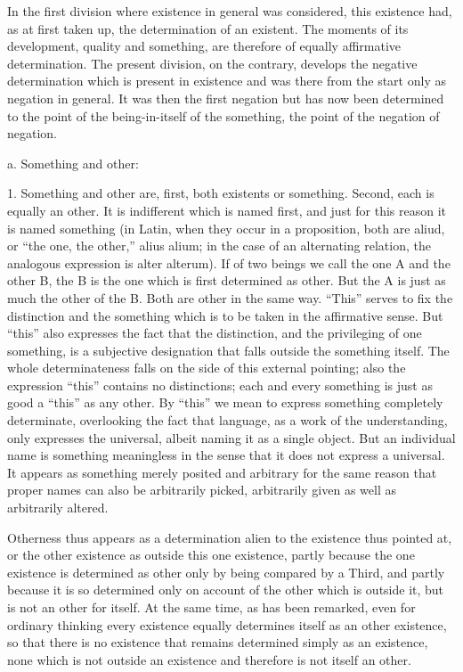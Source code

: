 In the first division where existence in general was considered,
this existence had, as at first taken up, the determination of an existent.
The moments of its development, quality and something,
are therefore of equally affirmative determination.
The present division, on the contrary, develops
the negative determination which is present in existence
and was there from the start only as negation in general.
It was then the first negation but has now been determined to
the point of the being-in-itself of the something,
the point of the negation of negation.

a. Something and other:

1. Something and other are,
first, both existents or something.
Second, each is equally an other.
It is indifferent which is named first,
and just for this reason it is named something
(in Latin, when they occur in a proposition,
both are aliud, or “the one, the other,” alius alium;
in the case of an alternating relation,
the analogous expression is alter alterum).
If of two beings we call the one A and the other B,
the B is the one which is first determined as other.
But the A is just as much the other of the B.
Both are other in the same way.
“This” serves to fix the distinction
and the something which is to be taken in the affirmative sense.
But “this” also expresses the fact that the distinction,
and the privileging of one something,
is a subjective designation that falls outside the something itself.
The whole determinateness falls on the side of this external pointing;
also the expression “this” contains no distinctions;
each and every something is just as good a “this” as any other.
By “this” we mean to express something completely determinate,
overlooking the fact that language, as a work of the understanding,
only expresses the universal, albeit naming it as a single object.
But an individual name is something meaningless in the sense
that it does not express a universal.
It appears as something merely posited
and arbitrary for the same reason
that proper names can also be arbitrarily picked,
arbitrarily given as well as arbitrarily altered.

Otherness thus appears as a determination
alien to the existence thus pointed at,
or the other existence as outside this one existence,
partly because the one existence is determined as other
only by being compared by a Third,
and partly because it is so determined
only on account of the other which is outside it,
but is not an other for itself.
At the same time, as has been remarked,
even for ordinary thinking every existence
equally determines itself as an other existence,
so that there is no existence
that remains determined simply as an existence,
none which is not outside an existence
and therefore is not itself an other.

